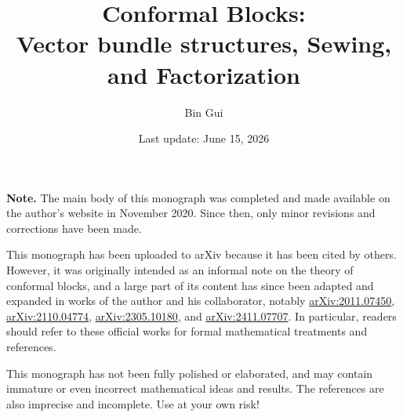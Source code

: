\documentclass[12pt,b5paper,notitlepage]{report}
\title{Conformal Blocks:\\[0.5ex] \large Vector bundle structures, Sewing, and Factorization}
\author{{\sc Bin Gui}
}
\date{Last update: June 15, 2026}
\theoremstyle{definition}
\theoremstyle{plain}
\numberwithin{equation}{section}
\begin{document}
\sloppy %



	\maketitle

\noindent\textbf{Note.}
The main body of this monograph was completed and made available on the author's website in November 2020. Since then, only minor revisions and corrections have been made. 

This monograph has been uploaded to arXiv because it has been cited by others. However, it was originally intended as an informal note on the theory of conformal blocks, and a large part of its content has since been adapted and expanded in works of the author and his collaborator, notably
\href{https://arxiv.org/abs/2011.07450}{arXiv:2011.07450},
\href{https://arxiv.org/abs/2110.04774}{arXiv:2110.04774},
\href{https://arxiv.org/abs/2305.10180}{arXiv:2305.10180}, and
\href{https://arxiv.org/abs/2411.07707}{arXiv:2411.07707}.
In particular, readers should refer to these official works for formal mathematical treatments and references.

This monograph has not been fully polished or elaborated, and may contain immature or even incorrect mathematical ideas and results. The references are also imprecise and incomplete. Use at your own risk!\\







\makeatletter
\newcommand*{\toccontents}{}
\makeatother
\toccontents
	

\end{document}
